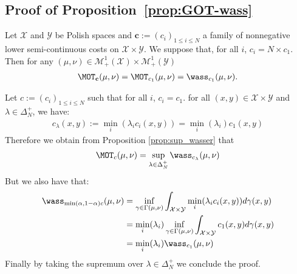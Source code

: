 \subsection{Proof of Proposition~\ref{prop:GOT-wass}}
\begin{prop*}
Let $\mathcal{X}$ and $\mathcal{Y}$ be Polish spaces and $\mathbf{c}:=(c_i)_{1\leq i\leq N}$ a family of nonnegative lower semi-continuous costs on $\mathcal{X}\times \mathcal{Y}$. We suppose that, for all $i$, $c_i= N\times c_1$. Then for any $(\mu,\nu)\in\mathcal{M}_+^{1}(\mathcal{X})\times\mathcal{M}_+^{1}(\mathcal{Y})$  
\begin{align}
    \MOT_{\mathbf{c}}(\mu,\nu)=\MOT_{c_1}(\mu,\nu)=\wass_{c_1}(\mu,\nu).
\end{align}
\end{prop*}
\begin{prv*}
Let $c:=(c_i)_{1\leq i\leq N}$ such that for all $i$, $c_i=c_1$. for all $(x,y)\in\mathcal{X}\times \mathcal{Y}$ and $\lambda\in\Delta_N^{+}$, we have:
\begin{align*}
    c_\lambda(x,y):=\min_i(\lambda_i c_i(x,y)) = \min_i(\lambda_i)c_1(x,y)
\end{align*}
Therefore we obtain from Proposition \ref{prop:sup_wasser} that
\begin{align}
    \MOT_{c}(\mu,\nu)=\sup_{\lambda\in\Delta_N^{+}} \wass_{c_\lambda}(\mu,\nu)
\end{align}
But we also have that:
\begin{align*}
    \wass_{\min(\alpha ,1-\alpha)c}(\mu,\nu)&=\inf_{\gamma\in\Gamma(\mu,\nu)}\int_{\mathcal{X}\times \mathcal{Y}} \min_i(\lambda_i c_i(x,y))d\gamma(x,y)\\
    &=\min_i(\lambda_i )\inf_{\gamma\in\Gamma(\mu,\nu)}\int_{\mathcal{X}\times \mathcal{Y}} c_1(x,y) d\gamma(x,y)\\
    &=\min_i(\lambda_i )  \wass_{c_1}(\mu,\nu)
\end{align*}
Finally by taking the supremum over $\lambda\in\Delta_N^{+}$ we conclude the proof.
\end{prv*}


